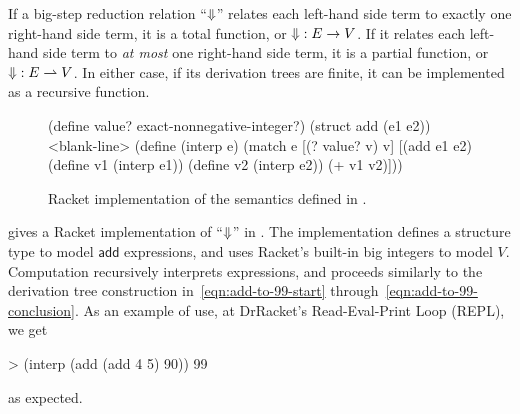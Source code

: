 If a big-step reduction relation ``$\operatorname{\Downarrow}$'' relates each left-hand side term to exactly one right-hand side term, it is a total function, or $\operatorname{\Downarrow} : E \to V$.
If it relates each left-hand side term to \emph{at most} one right-hand side term, it is a partial function, or $\operatorname{\Downarrow} : E \rightharpoonup V$.
In either case, if its derivation trees are finite, it can be implemented as a recursive function.

\begin{figure}[tb]\centering
\begin{schemedisplay}
(define value? exact-nonnegative-integer?)
(struct add (e1 e2))
<blank-line>
(define (interp e)
  (match e
    [(? value? v)  v]
    [(add e1 e2)  (define v1 (interp e1))
                  (define v2 (interp e2))
                  (+ v1 v2)]))
\end{schemedisplay}
\bottomhrule
\caption[Implementation of the big-step semantics]{Racket implementation of the semantics defined in .}
\label{fig:add-language-impl}
\end{figure}

 gives a Racket implementation of ``$\operatorname{\Downarrow}$'' in .
The implementation defines a structure type  to model $\mathsf{add}$ expressions, and uses Racket's built-in big integers to model $V$.
Computation recursively interprets expressions, and proceeds similarly to the derivation tree construction in~\eqref{eqn:add-to-99-start} through~\eqref{eqn:add-to-99-conclusion}.
As an example of use, at DrRacket's Read-Eval-Print Loop (REPL), we get
\begin{center}
\singlespacing
\begin{schemedisplay}
          > (interp (add (add 4 5) 90))
          99
\end{schemedisplay}
\end{center}
as expected.

